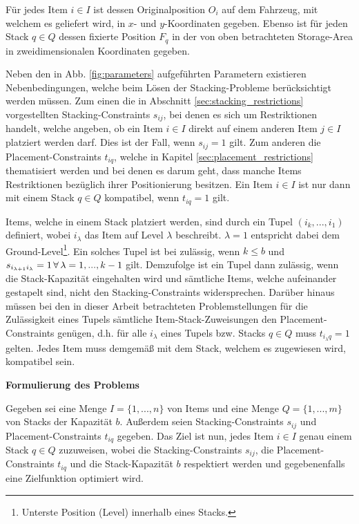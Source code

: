 \pagebreak

Für jedes Item $i \in I$ ist dessen Originalposition $O_i$ auf dem Fahrzeug, mit welchem es geliefert wird,
in $x$- und $y$-Koordinaten gegeben. Ebenso ist für jeden Stack $q \in Q$ dessen fixierte Position $F_q$ in der von oben betrachteten Storage-Area in zweidimensionalen Koordinaten gegeben.

Neben den in Abb. \ref{fig:parameters} aufgeführten Parametern existieren Nebenbedingungen, welche beim Lösen der Stacking-Probleme
berücksichtigt werden müssen. Zum einen die in Abschnitt \ref{sec:stacking_restrictions} vorgestellten Stacking-Constraints $s_{ij}$, bei denen es sich um Restriktionen handelt, welche angeben, ob ein Item $i \in I$ direkt auf einem anderen Item $j \in I$ platziert werden darf. Dies ist der Fall, wenn $s_{ij} = 1$ gilt.
Zum anderen die Placement-Constraints $t_{iq}$, welche in Kapitel \ref{sec:placement_restrictions} thematisiert werden und bei denen es darum geht, dass manche Items Restriktionen bezüglich ihrer Positionierung besitzen. Ein Item $i \in I$ ist nur dann mit einem Stack $q \in Q$ kompatibel, wenn $t_{iq} = 1$ gilt.

Items, welche in einem Stack platziert werden, sind durch ein Tupel $(i_k, ..., i_1)$ definiert, wobei
$i_\lambda$ das Item auf Level $\lambda$ beschreibt. $\lambda = 1$ entspricht dabei dem
Ground-Level\footnote{Unterste Position (Level) innerhalb eines Stacks.}.
Ein solches Tupel ist bei \citet{Bruns2015} zulässig, wenn $k \leq b$ und $s_{i_{\lambda + 1} i_\lambda} = 1
\thinspace \forall \thinspace \lambda = 1, ... , k - 1$ gilt.
Demzufolge ist ein Tupel dann zulässig, wenn die Stack-Kapazität eingehalten wird und sämtliche Items,
welche aufeinander gestapelt sind, nicht den Stacking-Constraints widersprechen. Darüber hinaus müssen bei den in dieser
Arbeit betrachteten Problemstellungen für die Zulässigkeit eines Tupels sämtliche Item-Stack-Zuweisungen
den Placement-Constraints genügen, d.h. für alle $i_\lambda$ eines Tupels bzw. Stacks $q \in Q$ muss
$t_{i_\lambda q} = 1$ gelten. Jedes Item muss demgemäß mit dem Stack, welchem es zugewiesen wird, kompatibel sein.
\newline

\textbf{Formulierung des Problems}

Gegeben sei eine Menge $I = \{1, ..., n\}$ von Items und eine Menge $Q = \{1, ..., m\}$ von Stacks der Kapazität $b$.
Außerdem seien Stacking-Constraints $s_{ij}$ und Placement-Constraints $t_{iq}$ gegeben.
Das Ziel ist nun, jedes Item $i \in I$ genau einem Stack $q \in Q$ zuzuweisen, wobei die Stacking-Constraints $s_{ij}$,
die Placement-Constraints $t_{iq}$ und die Stack-Kapazität $b$ respektiert werden und gegebenenfalls eine Zielfunktion
optimiert wird.

